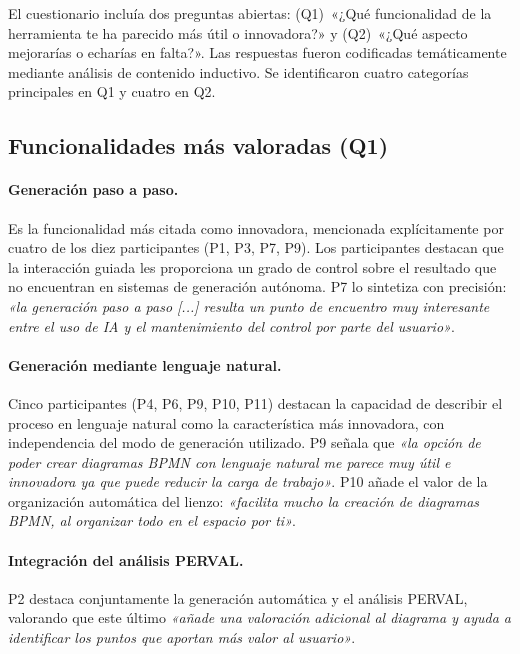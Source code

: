 El cuestionario incluía dos preguntas abiertas: (Q1)~«¿Qué funcionalidad de la herramienta te ha parecido más útil o innovadora?» y (Q2)~«¿Qué aspecto mejorarías o echarías en falta?». Las respuestas fueron codificadas temáticamente mediante análisis de contenido inductivo. Se identificaron cuatro categorías principales en Q1 y cuatro en Q2.

\subsection{Funcionalidades más valoradas (Q1)}\label{subsec:q1}

\paragraph{Generación paso a paso.} Es la funcionalidad más citada como innovadora, mencionada explícitamente por cuatro de los diez participantes (P1, P3, P7, P9). Los participantes destacan que la interacción guiada les proporciona un grado de control sobre el resultado que no encuentran en sistemas de generación autónoma. P7 lo sintetiza con precisión: \textit{«la generación paso a paso [...] resulta un punto de encuentro muy interesante entre el uso de IA y el mantenimiento del control por parte del usuario»}.

\paragraph{Generación mediante lenguaje natural.} Cinco participantes (P4, P6, P9, P10, P11) destacan la capacidad de describir el proceso en lenguaje natural como la característica más innovadora, con independencia del modo de generación utilizado. P9 señala que \textit{«la opción de poder crear diagramas BPMN con lenguaje natural me parece muy útil e innovadora ya que puede reducir la carga de trabajo»}. P10 añade el valor de la organización automática del lienzo: \textit{«facilita mucho la creación de diagramas BPMN, al organizar todo en el espacio por ti»}.

\paragraph{Integración del análisis PERVAL.} P2 destaca conjuntamente la generación automática y el análisis PERVAL, valorando que este último \textit{«añade una valoración adicional al diagrama y ayuda a identificar los puntos que aportan más valor al usuario»}.

